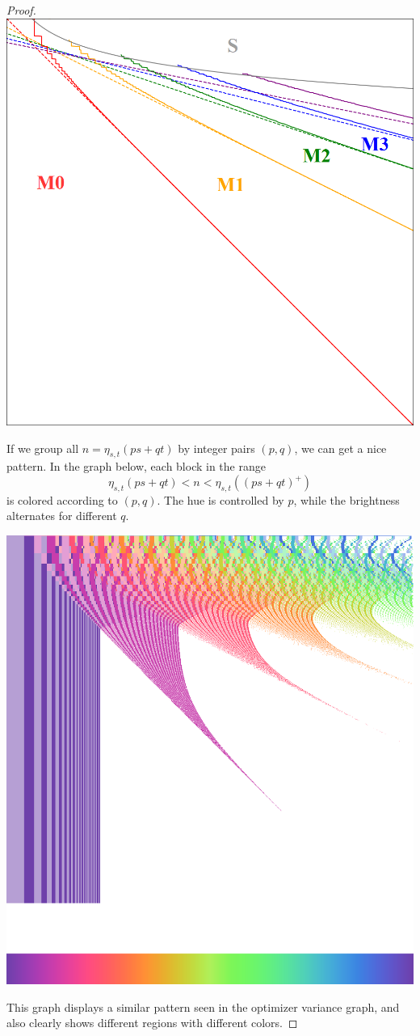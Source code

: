 \documentclass[]{article}
\begin{document}
\begin{proof}
	\includegraphics[scale=0.3]{mode.png}

	If we group all $n = \eta_{s,t}(ps + qt)$ by integer pairs $(p, q)$, we can get a nice pattern. In the graph below, each block in the range
	\[
	\eta_{s,t}(ps + qt) < n < \eta_{s,t}((ps + qt)^+)
	\]
	is colored according to $(p, q)$. The hue is controlled by $p$, while the brightness alternates for different $q$.

	\includegraphics[scale=0.3]{web.png}

	This graph displays a similar pattern seen in the optimizer variance graph, and also clearly shows different regions with different colors.
\end{proof}
\end{document}
